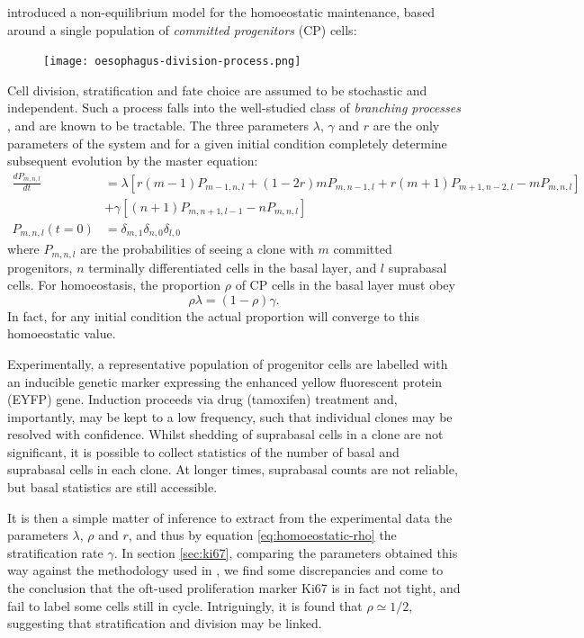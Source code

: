 \documentclass[10pt,english]{report}
\begin{document}
\citet{klein08} introduced a non-equilibrium model for the homoeostatic maintenance, based around a single population of \emph{committed progenitors} (CP) cells:

\begin{figure}[htb]
	\centering
	\texttt{[image: oesophagus-division-process.png]}
\end{figure}

Cell division, stratification and fate choice are assumed to be stochastic and independent. Such a process falls into the well-studied class of \emph{branching processes} \citep{athreya&ney}, and are known to be tractable. The three parameters $\lambda$, $\gamma$ and $r$ are the only parameters of the system and for a given initial condition completely determine subsequent evolution by the master equation:
\begin{align}
\nonumber
\frac{dP_{m,n,l}}{dt} &= \lambda\left[r (m-1)P_{m-1,n,l} + (1-2r)mP_{m,n-1,l} + r(m+1)P_{m+1,n-2,l} - mP_{m,n,l}\right] \\
                    &+ \gamma\left[(n+1)P_{m,n+1,l-1} - nP_{m,n,l}\right] \label{eq:ABC-master} \\
\nonumber
P_{m,n,l}(t = 0) &= \delta_{m,1} \delta_{n,0} \delta_{l,0}
\end{align}
where $P_{m,n,l}$ are the probabilities of seeing a clone with $m$ committed progenitors, $n$ terminally differentiated cells in the basal layer, and $l$ suprabasal cells. For homoeostasis, the proportion $\rho$ of CP cells in the basal layer must obey
\begin{equation}
\rho \lambda = (1-\rho) \gamma.\label{eq:homoeostatic-rho}
\end{equation}
In fact, for any initial condition the actual proportion will converge to this homoeostatic value.

Experimentally, a representative population of progenitor cells are labelled with an inducible genetic marker expressing the enhanced yellow fluorescent protein (EYFP) gene. Induction proceeds via drug (tamoxifen) treatment and, importantly, may be kept to a low frequency, such that individual clones may be resolved with confidence. Whilst shedding of suprabasal cells in a clone are not significant, it is possible to collect statistics of the number of basal and suprabasal cells in each clone. At longer times, suprabasal counts are not reliable, but basal statistics are still accessible.

It is then a simple matter of inference to extract from the experimental data the parameters $\lambda$, $\rho$ and $r$, and thus by equation \eqref{eq:homoeostatic-rho} the stratification rate $\gamma$. In section \ref{sec:ki67}, comparing the parameters obtained this way against the methodology used in \citet{clayton}, we find some discrepancies and come to the conclusion that the oft-used proliferation marker Ki67 is in fact not tight, and fail to label some cells still in cycle. Intriguingly, it is found that $\rho \simeq 1/2$, suggesting that stratification and division may be linked.
\end{document}
